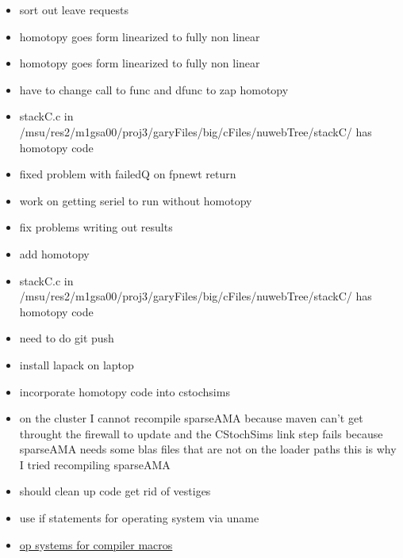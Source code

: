 \documentclass[hyperref]{labbook}
\begin{document}

\begin{itemize}
\item sort out leave requests
\end{itemize}


\begin{itemize}
\item homotopy goes form linearized to fully non linear
\end{itemize}



\begin{itemize}
\item homotopy goes form linearized to fully non linear
\item have to change call to func and dfunc to zap homotopy
\item stackC.c in /msu/res2/m1gsa00/proj3/garyFiles/big/cFiles/nuwebTree/stackC/ has homotopy code
\end{itemize}


\begin{itemize}
\item fixed problem with failedQ on fpnewt return
\item work on getting seriel to run without homotopy
\item fix problems writing out results
\item add homotopy
\item stackC.c in /msu/res2/m1gsa00/proj3/garyFiles/big/cFiles/nuwebTree/stackC/ has homotopy code
\item need to do git push
\end{itemize}





\begin{itemize}
\item install lapack on laptop
\item incorporate homotopy code into cstochsims
\item on the cluster I cannot recompile sparseAMA because maven can't get throught the firewall to update and the CStochSims link step fails because sparseAMA needs some blas files that are not on the loader paths  this is why I tried recompiling sparseAMA
\item should clean up code get rid of vestiges
\item use if statements for operating system via uname
\item \href{https://sourceforge.net/p/predef/wiki/OperatingSystems/}{op systems for compiler macros}

\end{itemize}
\end{document}
